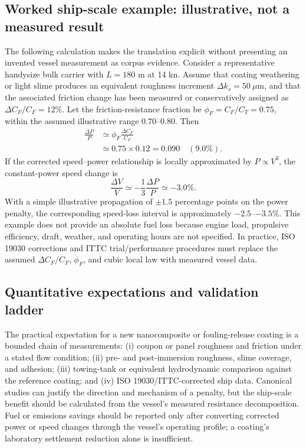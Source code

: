 \subsection{Worked ship-scale example: illustrative, not a measured result}
The following calculation makes the translation explicit without presenting an invented vessel measurement as corpus evidence. Consider a representative handysize bulk carrier with $L=180$ m at 14 kn. Assume that coating weathering or light slime produces an equivalent roughness increment $\Delta k_s=50~\mu$m, and that the associated friction change has been measured or conservatively assigned as $\Delta C_F/C_F=12\%$. Let the friction-resistance fraction be $\phi_F=C_F/C_T=0.75$, within the assumed illustrative range $0.70$--$0.80$. Then
\begin{align}
\frac{\Delta P}{P} &\simeq \phi_F\frac{\Delta C_F}{C_F} \\
&\simeq 0.75\times0.12=0.090\quad (9.0\%).
\end{align}
If the corrected speed--power relationship is locally approximated by $P\propto V^3$, the constant-power speed change is
\begin{equation}
\frac{\Delta V}{V}\simeq-\frac{1}{3}\frac{\Delta P}{P}\simeq-3.0\%.
\end{equation}
With a simple illustrative propagation of $\pm1.5$ percentage points on the power penalty, the corresponding speed-loss interval is approximately $-2.5$--$-3.5\%$. This example does not provide an absolute fuel loss because engine load, propulsive efficiency, draft, weather, and operating hours are not specified. In practice, ISO 19030 corrections and ITTC trial/performance procedures must replace the assumed $\Delta C_F/C_F$, $\phi_F$, and cubic local law with measured vessel data.

\subsection{Quantitative expectations and validation ladder}
The practical expectation for a new nanocomposite or fouling-release coating is a bounded chain of measurements: (i) coupon or panel roughness and friction under a stated flow condition; (ii) pre- and post-immersion roughness, slime coverage, and adhesion; (iii) towing-tank or equivalent hydrodynamic comparison against the reference coating; and (iv) ISO 19030/ITTC-corrected ship data. Canonical studies can justify the direction and mechanism of a penalty, but the ship-scale benefit should be calculated from the vessel's measured resistance decomposition. Fuel or emissions savings should be reported only after converting corrected power or speed changes through the vessel's operating profile; a coating's laboratory settlement reduction alone is insufficient.

